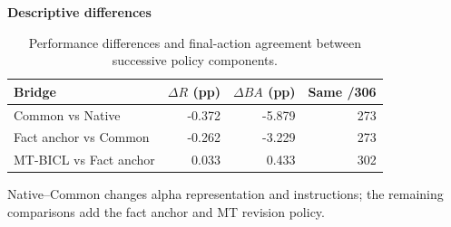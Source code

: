 \begin{table}[htb]
\centering\small
\setlength{\tabcolsep}{3pt}
\renewcommand{\arraystretch}{1.12}
\caption{Performance differences and final-action agreement between successive policy components.}
\label{tab:u09-bridge}
\textbf{Descriptive differences}\par\smallskip
\begin{tabular}{lrrr}
\hline
Bridge & $\Delta R$ (pp) & $\Delta BA$ (pp) & Same /306 \\
\hline
Common vs Native & -0.372 & -5.879 & 273 \\
Fact anchor vs Common & -0.262 & -3.229 & 273 \\
MT-BICL vs Fact anchor & 0.033 & 0.433 & 302 \\
\hline
\end{tabular}\par\medskip
\begin{minipage}{\textwidth}\footnotesize Native--Common changes alpha representation and instructions; the remaining comparisons add the fact anchor and MT revision policy.\end{minipage}
\end{table}
